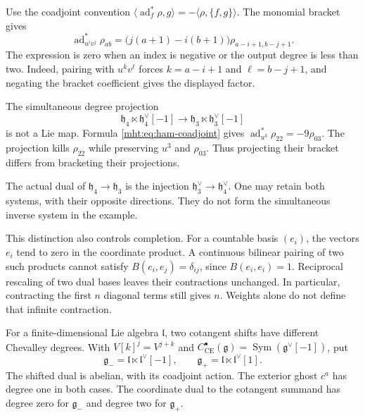 Use the coadjoint convention
$\langle\operatorname{ad}_f^*\rho,g\rangle
=-\langle\rho,\{f,g\}\rangle$. The monomial bracket gives
\begin{equation}\label{mht:eq:ham-coadjoint}
 \operatorname{ad}_{u^iv^j}^*\rho_{ab}
  =\bigl(j(a+1)-i(b+1)\bigr)
       \rho_{a-i+1,b-j+1}.
\end{equation}
The expression is zero when an index is negative or the output
degree is less than two. Indeed, pairing with $u^kv^\ell$ forces
$k=a-i+1$ and $\ell=b-j+1$, and negating the bracket coefficient
gives the displayed factor.

\begin{example}\label{mht:ex:cotangent-jet-projection}
The simultaneous degree projection
\[
 \mathfrak h_4\ltimes\mathfrak h_4^\vee[-1]
 \longrightarrow
 \mathfrak h_3\ltimes\mathfrak h_3^\vee[-1]
\]
is not a Lie map. Formula \eqref{mht:eq:ham-coadjoint} gives
$\operatorname{ad}_{u^3}^*\rho_{22}=-9\rho_{03}$.
The projection kills $\rho_{22}$ while preserving $u^3$ and
$\rho_{03}$. Thus projecting their bracket differs from bracketing
their projections.
\end{example}

The actual dual of $\mathfrak h_4\to\mathfrak h_3$ is the injection
$\mathfrak h_3^\vee\to\mathfrak h_4^\vee$. One may retain both
systems, with their opposite directions. They do not form the
simultaneous inverse system in the example.

This distinction also controls completion. For a countable basis
$(e_i)$, the vectors $e_i$ tend to zero in the coordinate product.
A continuous bilinear pairing of two such products cannot satisfy
$B(e_i,e_j)=\delta_{ij}$, since $B(e_i,e_i)=1$.
Reciprocal rescaling of two dual bases leaves their contractions
unchanged. In particular, contracting the first $n$ diagonal
terms still gives $n$. Weights alone do not define that infinite
contraction.

For a finite-dimensional Lie algebra $\mathfrak l$, two cotangent
shifts have different Chevalley degrees. With
$V[k]^j=V^{j+k}$ and
$C^\bullet_{\mathrm{CE}}(\mathfrak g)
=\operatorname{Sym}(\mathfrak g^\vee[-1])$, put
\[
 \mathfrak g_-=\mathfrak l\ltimes\mathfrak l^\vee[-1],
 \qquad
 \mathfrak g_+=\mathfrak l\ltimes\mathfrak l^\vee[1].
\]
The shifted dual is abelian, with its coadjoint action.
The exterior ghost $c^a$ has degree one in both cases.
The coordinate dual to the cotangent summand has degree zero for
$\mathfrak g_-$ and degree two for $\mathfrak g_+$.


